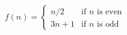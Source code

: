 \[
f(n) = 
\begin{cases} 
    n/2 & \text{if } n \text{ is even} \\
    3n+1 & \text{if } n \text{ is odd} 
\end{cases}
\]
